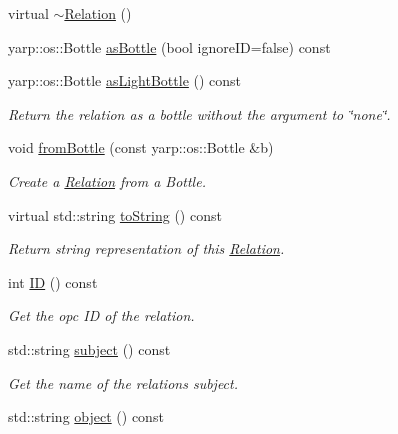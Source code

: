 \begin{DoxyCompactItemize}
\item 
virtual \hyperlink{group__icubclient__representations_a2539248fae2e1ff137e39d8fddf537ff}{$\sim$\+Relation} ()
\item 
yarp\+::os\+::\+Bottle \hyperlink{group__icubclient__representations_abd8f5fd5ffde5d321e8c5ba9feb5e929}{as\+Bottle} (bool ignore\+ID=false) const
\item 
yarp\+::os\+::\+Bottle \hyperlink{group__icubclient__representations_ad3b7769384f11727be8e4e9d491342f2}{as\+Light\+Bottle} () const
\begin{DoxyCompactList}\small\item\em Return the relation as a bottle without the argument to \char`\"{}none\char`\"{}. \end{DoxyCompactList}\item 
void \hyperlink{group__icubclient__representations_aacd17ed756214b7cab4baf9708257340}{from\+Bottle} (const yarp\+::os\+::\+Bottle \&b)
\begin{DoxyCompactList}\small\item\em Create a \hyperlink{group__icubclient__representations_classicubclient_1_1Relation}{Relation} from a Bottle. \end{DoxyCompactList}\item 
virtual std\+::string \hyperlink{group__icubclient__representations_a30f68703dc4a28bc03a79503177f5466}{to\+String} () const
\begin{DoxyCompactList}\small\item\em Return string representation of this \hyperlink{group__icubclient__representations_classicubclient_1_1Relation}{Relation}. \end{DoxyCompactList}\item 
int \hyperlink{group__icubclient__representations_ad69f93ae76f642e9c47178789b694b93}{ID} () const
\begin{DoxyCompactList}\small\item\em Get the opc ID of the relation. \end{DoxyCompactList}\item 
std\+::string \hyperlink{group__icubclient__representations_a7001a61802fd1292a54b20ab4bb2565e}{subject} () const
\begin{DoxyCompactList}\small\item\em Get the name of the relation\textquotesingle{}s subject. \end{DoxyCompactList}\item 
std\+::string \hyperlink{group__icubclient__representations_a701b6174e22c50ce091c321faca34df3}{object} () const

\end{DoxyCompactItemize}
